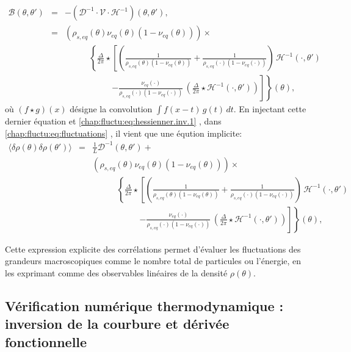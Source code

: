 \begin{eqnarray*}
	\mathcal{B}(\theta , \theta ' )  & = & - (\mathcal{D}^{-1}\cdot\mathcal{V}\cdot \mathcal{H}^{-1})(\theta , \theta') 	,\\
	& = & 	(\rho_{\! s , eq}(\theta) \nu_{\! eq}(\theta) (1 -  \nu_{\! eq}(\theta) )) \times \\
	&& ~~~~~~~~~~~~~\left \{  \frac{\Delta}{2\pi} \star  \left [ \left (  \frac{1}{\rho_{\! s, eq}(\theta)  (1 - \nu_{\! eq}(\theta)  )} +  \frac{1}{\rho_{\! s, eq}(\cdot) (1 - \nu_{\! eq} (\cdot )  )}\right )  \, \mathcal{H}^{-1}( \cdot , \theta ' )   \right. \right .\\
	&&  ~~~~~~~~~~~~~~~~~~~~~~~~~\left . \left .   -  \frac{\nu_{\! eq}(\cdot)}{\rho_{\! s, eq}(\cdot) ( 1 - \nu_{\! eq}(\cdot) )}  \, \left ( \frac{\Delta}{2\pi} \star \mathcal{H}^{-1}( \cdot , \theta ' )   \right )  \right ] \right \} (\theta),
\end{eqnarray*}
où \( (f \star g)(x) \) désigne la convolution \( \int f(x - t)\, g(t)\, dt \).
En injectant cette dernier équation et \eqref{chap:fluctu:eq:hessienner.inv.1} , dans \eqref{chap:fluctu:eq:fluctuations} , il vient que une éqution implicite:
\begin{eqnarray*}
	\langle \delta \rho(\theta) \delta	\rho(\theta') \rangle & = & \frac{1}{L} \mathcal{D}^{-1}(\theta , \theta') + \\
	&& 	(\rho_{\! s , eq}(\theta) \nu_{\! eq}(\theta) (1 -  \nu_{\! eq}(\theta) )) \times \\
	&& ~~~~~~~~~~~~~\left \{  \frac{\Delta}{2\pi} \star  \left [ \left (  \frac{1}{\rho_{\! s, eq}(\theta)  (1 - \nu_{\! eq}(\theta)  )} +  \frac{1}{\rho_{\! s, eq}(\cdot) (1 - \nu_{\! eq} (\cdot )  )}\right )  \, \mathcal{H}^{-1}( \cdot , \theta ' )   \right. \right .\\
	&&  ~~~~~~~~~~~~~~~~~~~~~~~~~\left . \left .   -  \frac{\nu_{\! eq}(\cdot)}{\rho_{\! s, eq}(\cdot) ( 1 - \nu_{\! eq}(\cdot) )}  \, \left ( \frac{\Delta}{2\pi} \star \mathcal{H}^{-1}( \cdot , \theta ' )   \right )  \right ] \right \} (\theta),
\end{eqnarray*}





Cette expression explicite des corrélations permet d'évaluer les fluctuations des grandeurs macroscopiques comme le nombre total de particules ou l'énergie, en les exprimant comme des observables linéaires de la densité \( \rho(\theta) \).


\subsection{Vérification numérique thermodynamique : inversion de la courbure et dérivée fonctionnelle}

